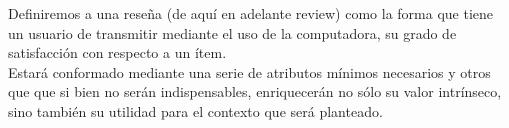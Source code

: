 Definiremos a una reseña (de aquí en adelante review) como la forma que tiene un usuario de transmitir mediante el uso de la computadora, su grado de satisfacción con respecto a un ítem.\\
Estará conformado mediante una serie de atributos mínimos necesarios y otros que que si bien no serán indispensables, enriquecerán no sólo su valor intrínseco, sino también su utilidad para el contexto que será planteado.\\
    
    